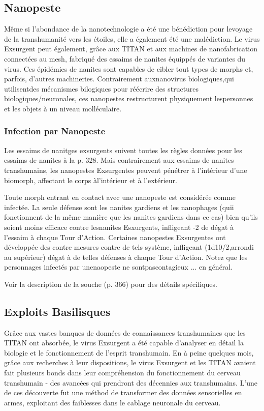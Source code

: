 \subsection{Nanopeste} 

Même si l'abondance de la nanotechnologie a été une bénédiction pour levoyage de la transhumanité vers les étoiles, elle a également été une malédiction. Le virus Exsurgent peut également, grâce aux TITAN et aux machines de nanofabrication connectées au mesh, fabriqué des essaims de nanites équippés de variantes du virus. Ces épidémies de nanites sont capables de cibler tout types de morphs et, parfois, d'autres machineries. Contrairement auxnanovirus biologiques,qui utilisentdes mécanismes bilogiques pour réécrire des structures biologiques/neuronales, ces nanopestes restructurent physiquement lespersonnes et les objets à un niveau molléculaire. 

\subsubsection{Infection par Nanopeste} 

Les essaims de nanitges exsurgents suivent toutes les règles données pour les essaims de nanites à la p. 328. Mais contrairement aux essaims de nanites transhumains, les nanopestes Exsurgentes peuvent pénétrer à l'intérieur d'une biomorph, affectant le corps àl'intérieur et à l'extérieur. 

Toute morph entrant en contact avec une nanopeste est considérée comme infectée. La seule défense sont les nanites gardiens et les nanophages (quii fonctionnent de la même manière que les nanites gardiens dans ce cas) bien qu'ils soient moins efficace contre lesnanites Esxurgents, infligeant -2 de dégat à l'essaim à chaque Tour d'Action. Certaines nanopestes Exsurgentes ont développée des contre mesures contre de tels système, infligeant (1d10/2,arrondi au supérieur) dégat à de telles défenses à chaque Tour d'Action. Notez que les personnages infectés par unenaopeste ne sontpascontagieux ... en général. 

Voir la description de la souche (p. 366) pour des détails spécifiques. 

\subsection{Exploits Basilisques} 

Grâce aux vastes banques de données de connaissances transhumaines que les TITAN ont absorbée, le virus Exsurgent a été capable d'analyser en détail la biologie et le fonctionnement de l'esprit transhumain. En à peine quelques mois, grâce aux recherches à leur dispositions, le virus Exsurgent et les TITAN avaient fait plusieurs bonds dans leur compréhension du fonctionnement du cerveau transhumain - des avancées qui prendront des décennies aux transhumains. L'une de ces découverte fut une méthod de transformer des données sensorielles en armes, exploitant des faiblesses dans le cablage neuronale du cerveau. 

